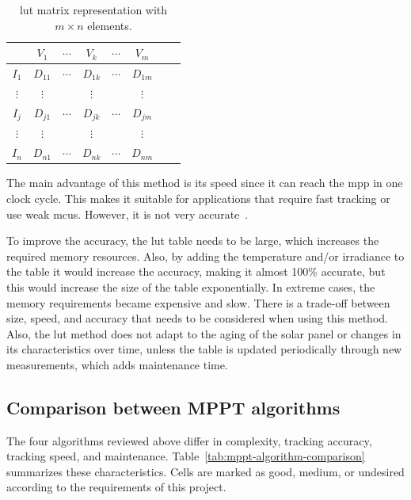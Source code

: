             \begin{table}[ht]
                \centering
                \caption{\acs{lut} matrix representation with $m \times n$ elements.}
                \label{tab:LUT_matrix}
                \renewcommand{\arraystretch}{1.3}
                \begin{tabular}{c|ccccccc}
                    & $V_1$ & $\cdots$ & $V_k$ & $\cdots$ & $V_m$ \\
                    \hline
                    $I_1$ & $D_{11}$ & $\cdots$ & $D_{1k}$ & $\cdots$ & $D_{1m}$ \\
                    $\vdots$ & $\vdots$ &  & $\vdots$ &  & $\vdots$ \\
                    $I_j$ & $D_{j1}$ & $\cdots$ & $D_{jk}$ & $\cdots$ & $D_{jm}$ \\
                    $\vdots$ & $\vdots$ &  & $\vdots$ &  & $\vdots$ \\
                    $I_n$ & $D_{n1}$ & $\cdots$ & $D_{nk}$ & $\cdots$ & $D_{nm}$
                \end{tabular}
            \end{table}

            The main advantage of this method is its speed since it can reach the \ac{mpp} in one clock cycle. This makes it suitable for applications that require fast tracking or use weak \acp{mcu}. However, it is not very accurate~\cite{Look-Up-Table_VS_PeO}. 

            To improve the accuracy, the \acs{lut} table needs to be large, which increases the required memory resources. Also, by adding the temperature and/or irradiance to the table it would increase the accuracy, making it almost 100\% accurate, but this would increase the size of the table exponentially. In extreme cases, the memory requirements became expensive and slow. There is a trade-off between size, speed, and accuracy that needs to be considered when using this method. Also, the \acs{lut} method does not adapt to the aging of the solar panel or changes in its characteristics over time, unless the table is updated periodically through new measurements, which adds maintenance time.

    \subsection{Comparison between MPPT algorithms}
        The four algorithms reviewed above differ in complexity, tracking accuracy, tracking speed, and maintenance. Table~\ref{tab:mppt-algorithm-comparison} summarizes these characteristics. Cells are marked as good, medium, or undesired according to the requirements of this project.


